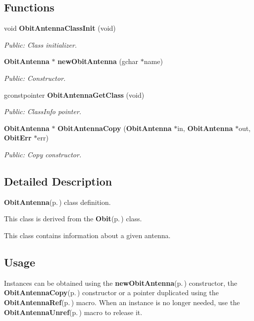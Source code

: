 \subsection*{Functions}
\begin{CompactItemize}
\item 
void {\bf Obit\-Antenna\-Class\-Init} (void)
\begin{CompactList}\small\item\em Public: Class initializer. \item\end{CompactList}\item 
{\bf Obit\-Antenna} $\ast$ {\bf new\-Obit\-Antenna} (gchar $\ast$name)
\begin{CompactList}\small\item\em Public: Constructor. \item\end{CompactList}\item 
gconstpointer {\bf Obit\-Antenna\-Get\-Class} (void)
\begin{CompactList}\small\item\em Public: Class\-Info pointer. \item\end{CompactList}\item 
{\bf Obit\-Antenna} $\ast$ {\bf Obit\-Antenna\-Copy} ({\bf Obit\-Antenna} $\ast$in, {\bf Obit\-Antenna} $\ast$out, {\bf Obit\-Err} $\ast$err)
\begin{CompactList}\small\item\em Public: Copy constructor. \item\end{CompactList}\end{CompactItemize}


\subsection{Detailed Description}
{\bf Obit\-Antenna}{\rm (p.\,\pageref{structObitAntenna})} class definition. 

This class is derived from the {\bf Obit}{\rm (p.\,\pageref{structObit})} class.

This class contains information about a given antenna.\subsection{Usage}\label{ObitAntenna_8h_ObitAntennaUsage}
Instances can be obtained using the {\bf new\-Obit\-Antenna}{\rm (p.\,\pageref{ObitAntenna_8c_a6})} constructor, the {\bf Obit\-Antenna\-Copy}{\rm (p.\,\pageref{ObitAntenna_8c_a8})} constructor or a pointer duplicated using the {\bf Obit\-Antenna\-Ref}{\rm (p.\,\pageref{ObitAntenna_8h_a1})} macro. When an instance is no longer needed, use the {\bf Obit\-Antenna\-Unref}{\rm (p.\,\pageref{ObitAntenna_8h_a0})} macro to release it.

